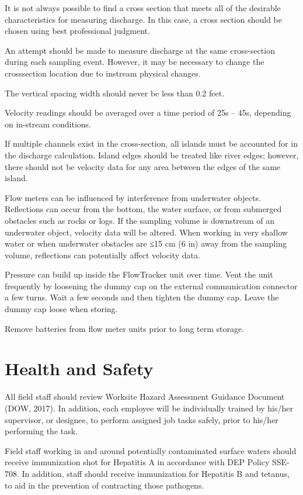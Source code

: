\documentclass[12pt]{../SOP3_beta}\usepackage[]{graphicx}\usepackage[]{xcolor}
\begin{document}
\NP It is not always possible to find a cross section that meets all of the desirable
characteristics for measuring discharge. In this case, a cross section should be
chosen using best professional judgment.

\NP An attempt should be made to measure discharge at the same cross-section
during each sampling event. However, it may be necessary to change the crosssection location due to instream physical changes.

\NP The vertical spacing width should never be less than 0.2 feet.

\NP Velocity readings should be averaged over a time period of 25s – 45s, depending
on in-stream conditions.

\NP If multiple channels exist in the cross-section, all islands must be accounted for
in the discharge calculation. Island edges should be treated like river edges; however, there should not be velocity data for any area between the edges of
the same island.

\NP Flow meters can be influenced by interference from underwater objects.
Reflections can occur from the bottom, the water surface, or from submerged
obstacles such as rocks or logs. If the sampling volume is downstream of an
underwater object, velocity data will be altered. When working in very shallow
water or when underwater obstacles are ≤15 cm (6 in) away from the sampling
volume, reflections can potentially affect velocity data.

\NP Pressure can build up inside the FlowTracker unit over time. Vent the unit
frequently by loosening the dummy cap on the external communication
connector a few turns. Wait a few seconds and then tighten the dummy cap.
Leave the dummy cap loose when storing.

\NP Remove batteries from flow meter units prior to long term storage.


\section{Health and Safety}

\NP All field staff should review Worksite Hazard Assessment Guidance Document (DOW,
2017). In addition, each employee will be individually trained by his/her supervisor, or
designee, to perform assigned job tasks safely, prior to his/her performing the task.


\NP Field staff working in and around potentially contaminated surface waters should
receive immunization shot for Hepatitis A in accordance with DEP Policy SSE-708. In
addition, staff should receive immunization for Hepatitis B and tetanus, to aid in the
prevention of contracting those pathogens. 
\end{document}
